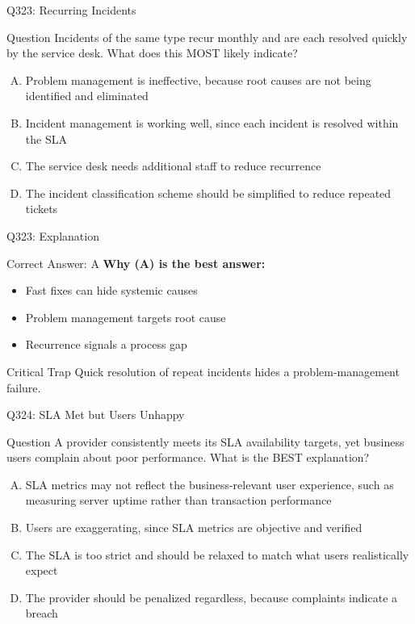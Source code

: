 \documentclass{beamer}
\begin{document}
	\begin{frame}{Q323: Recurring Incidents}
		\begin{block}{Question}
			\small Incidents of the same type recur monthly and are each resolved quickly by the service desk. What does this MOST likely indicate?
		\end{block}
		\begin{enumerate}[(A)]
			\footnotesize
			\item Problem management is ineffective, because root causes are not being identified and eliminated
			\item Incident management is working well, since each incident is resolved within the SLA
			\item The service desk needs additional staff to reduce recurrence
			\item The incident classification scheme should be simplified to reduce repeated tickets
		\end{enumerate}
	\end{frame}
	
	\begin{frame}{Q323: Explanation}
		\begin{block}{Correct Answer: A}
			\textbf{Why (A) is the best answer:}
			\begin{itemize}
				\item Fast fixes can hide systemic causes
				\item Problem management targets root cause
				\item Recurrence signals a process gap
			\end{itemize}
		\end{block}
		\begin{alertblock}{Critical Trap}
			Quick resolution of repeat incidents hides a problem-management failure.
		\end{alertblock}
	\end{frame}
	
	\begin{frame}{Q324: SLA Met but Users Unhappy}
		\begin{block}{Question}
			\small A provider consistently meets its SLA availability targets, yet business users complain about poor performance. What is the BEST explanation?
		\end{block}
		\begin{enumerate}[(A)]
			\footnotesize
			\item SLA metrics may not reflect the business-relevant user experience, such as measuring server uptime rather than transaction performance
			\item Users are exaggerating, since SLA metrics are objective and verified
			\item The SLA is too strict and should be relaxed to match what users realistically expect
			\item The provider should be penalized regardless, because complaints indicate a breach
		\end{enumerate}
	\end{frame}
	
\end{document}

